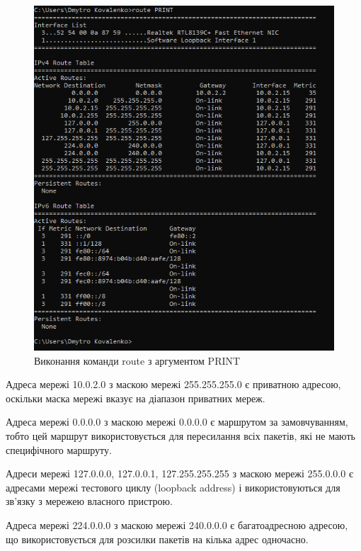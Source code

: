 \documentclass{article}
\begin{document}
\begin{normalsize}
\begin{figure}[H]
	\centering
	\includegraphics[width=\textwidth]{31}
	\caption{Виконання команди route з аргументом PRINT}
\end{figure}

\begin{list}{-}{}
	\item Адреса мережі 10.0.2.0 з маскою мережі 255.255.255.0 є приватною адресою, оскільки маска мережі вказує на діапазон приватних мереж.
	\item Адреса мережі 0.0.0.0 з маскою мережі 0.0.0.0 є маршрутом за замовчуванням, тобто цей маршрут використовується для пересилання всіх пакетів, які не мають специфічного маршруту.
	\item Адреси мережі 127.0.0.0, 127.0.0.1, 127.255.255.255 з маскою мережі 255.0.0.0 є адресами мережі тестового циклу (loopback address) і використовуються для зв'язку з мережею власного пристрою.
	\item Адреса мережі 224.0.0.0 з маскою мережі 240.0.0.0 є багатоадресною адресою, що використовується для розсилки пакетів на кілька адрес одночасно.
\end{list}


\end{normalsize}
\end{document}
